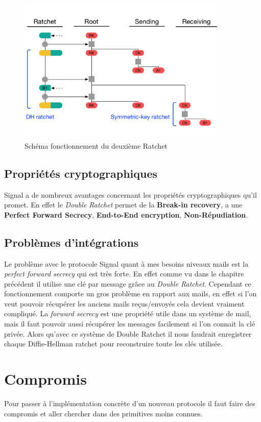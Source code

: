 \begin{figure}[h!]
	\centering
	\includegraphics[width=10cm]{images/secondRatchet.png}
	\caption{Schéma fonctionnement du deuxième Ratchet~\cite{doubleratchet}}
	\label{fig:signalSecond}
\end{figure}

\subsection{Propriétés cryptographiques}
Signal a de nombreux avantages concernant les propriétés cryptographiques qu'il promet. En effet le \textit{Double Ratchet} permet de la \textbf{Break-in recovery}, a une \textbf{Perfect Forward Secrecy}, \textbf{End-to-End encryption}, \textbf{Non-Répudiation}.
\subsection{Problèmes d'intégrations}
Le problème avec le protocole Signal quant à mes besoins niveaux mails est la \textit{perfect forward secrecy} qui est très forte. En effet comme vu dans le chapitre précédent il utilise une clé par message grâce au \textit{Double Ratchet}. Cependant ce fonctionnement comporte un gros problème en rapport aux mails, en effet si l'on veut pouvoir récupérer les anciens mails reçus/envoyés cela devient vraiment compliqué. La \textit{forward secrecy} est une propriété utile dans un système de mail, mais il faut pouvoir aussi récupérer les messages facilement si l'on connait la clé privée. Alors qu'avec ce système de Double Ratchet il nous faudrait enregistrer chaque Diffie-Hellman ratchet pour reconstruire toute les clés utilisée.
\section{Compromis}
Pour passer à l'implémentation concrète d'un nouveau protocole il faut faire des compromis et aller chercher dans des primitives moins connues.


